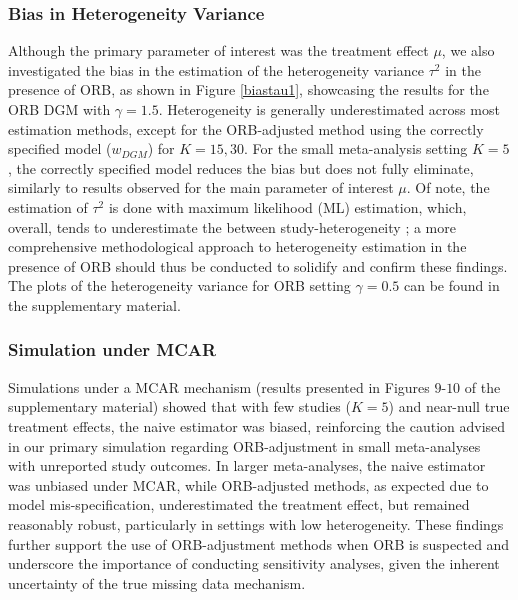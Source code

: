 \documentclass[twocolumn]{article}\usepackage[]{graphicx}\usepackage[]{xcolor}
\begin{document}
\subsubsection{Bias in Heterogeneity Variance}

Although the primary parameter of interest was the treatment effect $\mu$, we also investigated the bias in the estimation of the heterogeneity variance $\tau^2$ in the presence of ORB, as shown in Figure \ref{biastau1}, showcasing the results for the ORB DGM with $\gamma=1.5$. Heterogeneity is generally underestimated across most estimation methods, except for the ORB-adjusted method using the correctly specified model ($w_{DGM}$) for $K=15,30$. For the small meta-analysis setting $K=5$, the correctly specified model reduces the bias but does not fully eliminate, similarly to results observed for the main parameter of interest $\mu$. Of note, the estimation of $\tau^2$ is done with maximum likelihood (ML) estimation, which, overall, tends to underestimate the between study-heterogeneity \citep{REML2, REML}; a more comprehensive methodological approach to heterogeneity estimation in the presence of ORB should thus be conducted to solidify and confirm these findings. The plots of the heterogeneity variance for ORB setting $\gamma=0.5$ can be found in the supplementary material.

\subsubsection{Simulation under MCAR} \label{mcar}

Simulations under a MCAR mechanism (results presented in Figures $9$-$10$ of the supplementary material) showed that with few studies ($K = 5$) and near-null true treatment effects, the naive estimator was biased, reinforcing the caution advised in our primary simulation regarding ORB-adjustment in small meta-analyses with unreported study outcomes. In larger meta-analyses, the naive estimator was unbiased under MCAR, while ORB-adjusted methods, as expected due to model mis-specification, underestimated the treatment effect, but remained reasonably robust, particularly in settings with low heterogeneity. These findings further support the use of ORB-adjustment methods when ORB is suspected and underscore the importance of conducting sensitivity analyses, given the inherent uncertainty of the true missing data mechanism.
\end{document}
